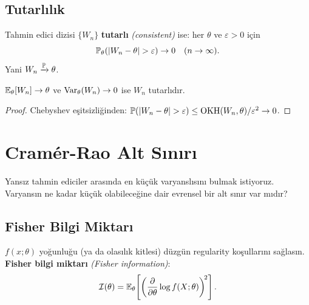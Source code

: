 \subsection{Tutarlılık}

\begin{tanim}[Tutarlılık]\label{def:tutarlilik}
Tahmin edici dizisi $\{W_n\}$ \textbf{tutarlı} \emph{(consistent)} ise: her $\theta$ ve $\varepsilon>0$ için
\[
  \Prob_\theta(|W_n - \theta|>\varepsilon) \to 0 \quad (n\to\infty).
\]
Yani $W_n \xrightarrow{\mathbb{P}} \theta$.
\end{tanim}

\begin{teorem}\label{thm:tutarli_yeterli}
$\mathbb{E}_\theta[W_n]\to\theta$ ve $\operatorname{Var}_\theta(W_n)\to 0$ ise $W_n$ tutarlıdır.
\end{teorem}

\begin{proof}
Chebyshev eşitsizliğinden: $\Prob(|W_n-\theta|>\varepsilon) \leq \mathrm{OKH}(W_n,\theta)/\varepsilon^2 \to 0$.
\end{proof}

\section{Cramér-Rao Alt Sınırı}
\label{sec:cramer_rao}

\begin{kesif}
Yansız tahmin ediciler arasında en küçük varyanslısını bulmak istiyoruz. Varyansın ne kadar küçük olabileceğine dair evrensel bir alt sınır var mıdır?
\end{kesif}

\subsection{Fisher Bilgi Miktarı}

\begin{tanim}\label{def:fisher_bilgisi}
$f(x;\theta)$ yoğunluğu (ya da olasılık kitlesi) düzgün regularity koşullarını sağlasın. \textbf{Fisher bilgi miktarı} \emph{(Fisher information)}:
\[
  \mathcal{I}(\theta) = \mathbb{E}_\theta\!\left[\left(\frac{\partial}{\partial\theta}\log f(X;\theta)\right)^{\!2}\right].
\]
\end{tanim}

